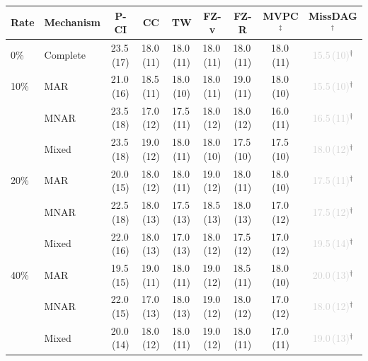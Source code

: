 \begin{tabular}{llccccccc}
    \toprule
    Rate & Mechanism & P-CI & CC & TW & FZ-v & FZ-R & MVPC$^\ddagger$ & MissDAG$^\dagger$ \\
    \midrule
    0\% & Complete & 23.5\,{\scriptsize(17)} & 18.0\,{\scriptsize(11)} & 18.0\,{\scriptsize(11)} & 18.0\,{\scriptsize(11)} & 18.0\,{\scriptsize(11)} & 18.0\,{\scriptsize(11)} & \textcolor{lightgray}{15.5\,{\scriptsize(10)}}$^\dagger$ \\
    \midrule
    10\% & MAR   & 21.0\,{\scriptsize(16)} & 18.5\,{\scriptsize(11)} & 18.0\,{\scriptsize(10)} & 18.0\,{\scriptsize(11)} & 19.0\,{\scriptsize(11)} & 18.0\,{\scriptsize(10)} & \textcolor{lightgray}{15.5\,{\scriptsize(10)}}$^\dagger$ \\
         & MNAR  & 23.5\,{\scriptsize(18)} & 17.0\,{\scriptsize(12)} & 17.5\,{\scriptsize(11)} & 18.0\,{\scriptsize(12)} & 18.0\,{\scriptsize(12)} & 16.0\,{\scriptsize(11)} & \textcolor{lightgray}{16.5\,{\scriptsize(11)}}$^\dagger$ \\
         & Mixed & 23.5\,{\scriptsize(18)} & 19.0\,{\scriptsize(12)} & 18.0\,{\scriptsize(11)} & 18.0\,{\scriptsize(10)} & 17.5\,{\scriptsize(10)} & 17.5\,{\scriptsize(10)} & \textcolor{lightgray}{18.0\,{\scriptsize(12)}}$^\dagger$ \\
    \midrule
    20\% & MAR   & 20.0\,{\scriptsize(15)} & 18.0\,{\scriptsize(12)} & 18.0\,{\scriptsize(11)} & 19.0\,{\scriptsize(12)} & 18.0\,{\scriptsize(11)} & 18.0\,{\scriptsize(10)} & \textcolor{lightgray}{17.5\,{\scriptsize(11)}}$^\dagger$ \\
         & MNAR  & 22.5\,{\scriptsize(18)} & 18.0\,{\scriptsize(13)} & 17.5\,{\scriptsize(13)} & 18.5\,{\scriptsize(13)} & 18.0\,{\scriptsize(13)} & 17.0\,{\scriptsize(12)} & \textcolor{lightgray}{17.5\,{\scriptsize(12)}}$^\dagger$ \\
         & Mixed & 22.0\,{\scriptsize(16)} & 18.0\,{\scriptsize(13)} & 17.0\,{\scriptsize(13)} & 18.0\,{\scriptsize(12)} & 17.5\,{\scriptsize(12)} & 17.0\,{\scriptsize(12)} & \textcolor{lightgray}{19.5\,{\scriptsize(14)}}$^\dagger$ \\
    \midrule
    40\% & MAR   & 19.5\,{\scriptsize(15)} & 19.0\,{\scriptsize(11)} & 18.0\,{\scriptsize(11)} & 19.0\,{\scriptsize(12)} & 18.5\,{\scriptsize(11)} & 18.0\,{\scriptsize(10)} & \textcolor{lightgray}{20.0\,{\scriptsize(13)}}$^\dagger$ \\
         & MNAR  & 22.0\,{\scriptsize(15)} & 17.0\,{\scriptsize(13)} & 18.0\,{\scriptsize(13)} & 19.0\,{\scriptsize(12)} & 18.0\,{\scriptsize(12)} & 17.0\,{\scriptsize(12)} & \textcolor{lightgray}{18.0\,{\scriptsize(12)}}$^\dagger$ \\
         & Mixed & 20.0\,{\scriptsize(14)} & 18.0\,{\scriptsize(12)} & 18.0\,{\scriptsize(11)} & 19.0\,{\scriptsize(12)} & 18.0\,{\scriptsize(11)} & 17.0\,{\scriptsize(11)} & \textcolor{lightgray}{19.0\,{\scriptsize(13)}}$^\dagger$ \\
    \bottomrule
\end{tabular}
